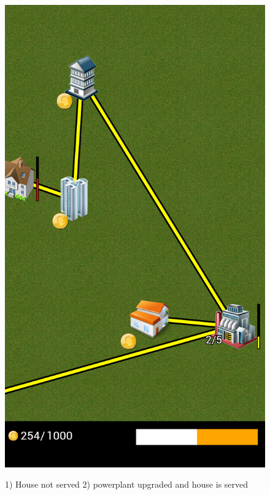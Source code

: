 \begin{figure}[H]
{			\includegraphics[scale=0.18]{pictures/sprint3-screen/serve.png}
		}
		\caption{1) House not served 2) powerplant upgraded and house is served}
	\end{figure}

